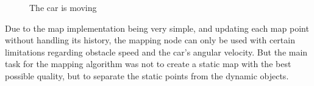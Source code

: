\begin{figure}[!ht]
    \centering
    \caption{The car is moving}
    \label{mapping_demo_car_moving}
\end{figure}

Due to the map implementation being very simple, and updating each map point without handling its history, the mapping node can only be used with certain limitations regarding obstacle speed and the car's angular velocity. But the main task for the mapping algorithm was not to create a static map with the best possible quality, but to separate the static points from the dynamic objects.

